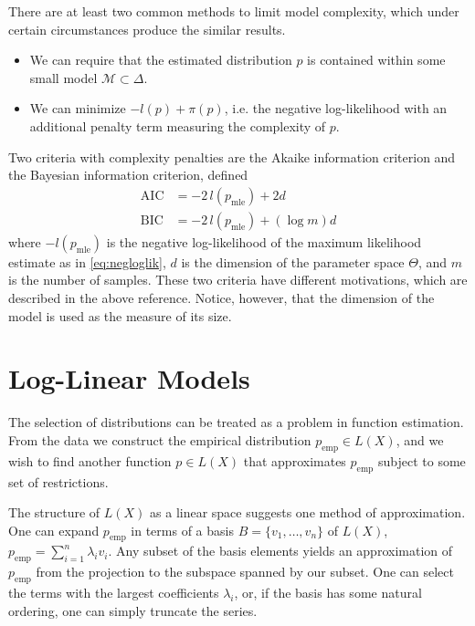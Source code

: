 \documentclass[cclicense]{hmcthesis}
\providecommand*{\ms}{\mathcal M}
\newcommand*{\mle}{\mathrm{mle}}
\newcommand*{\emp}{\mathrm{emp}}
\numberwithin{equation}{chapter}
\numberwithin{thmcounter}{chapter}
\begin{document}
    There are at least two common methods to limit model complexity, which under
    certain circumstances produce the similar results.
    \begin{itemize}
    \item We can require that the estimated distribution $p$ is contained within
    some small model $\ms \subset \Delta$.
    \item We can minimize $-l(p) + \pi(p)$, i.e. the negative log-likelihood
    with an additional penalty term measuring the complexity of $p$.
    \end{itemize}
    Two criteria with complexity penalties are the Akaike information criterion
    and the Bayesian information criterion, defined
    \begin{align*}
        \mathrm{AIC} &= -2\,l(p_\mle) + 2d \\
        \mathrm{BIC} &= -2\,l(p_\mle) + (\log m) d
    \end{align*}
    where $-l(p_\mle)$ is the negative log-likelihood of the maximum likelihood
    estimate as in \eqref{eq:negloglik}, $d$ is the dimension of the parameter
    space $\Theta$, and $m$ is the number of samples.  These two criteria have
    different motivations, which are described in the above reference.  Notice,
    however, that the dimension of the model is used as the measure of its size.

\section{Log-Linear Models}
    \label{sec:linear-models}
    
    The selection of distributions can be treated as a problem in function
    estimation.  From the data we construct the empirical distribution \mbox{$p_\emp
    \in L(X)$}, and we wish to find another function $p \in L(X)$ that
    approximates $p_\emp$ subject to some set of restrictions.  
    
    The structure of $L(X)$ as a linear space suggests one method of
    approximation.  One can expand $p_\emp$ in terms of a basis $B = \{v_1,
    \ldots, v_n\}$ of $L(X)$, $p_\emp = \sum_{i=1}^n \lambda_i v_i$.  Any subset
    of the basis elements yields an approximation of $p_\emp$ from the
    projection to the subspace spanned by our subset.  One can select the terms
    with the largest coefficients $\lambda_i$, or, if the basis has some natural
    ordering, one can simply truncate the series.
\end{document}
